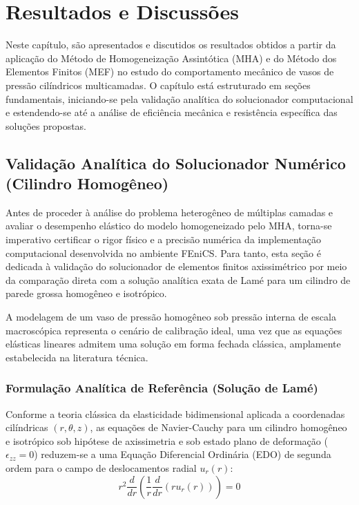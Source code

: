 \chapter{Resultados e Discussões}\label{cap:resultados}

Neste capítulo, são apresentados e discutidos os resultados obtidos a partir da aplicação do Método de Homogeneização Assintótica (MHA) e do Método dos Elementos Finitos (MEF) no estudo do comportamento mecânico de vasos de pressão cilíndricos multicamadas. O capítulo está estruturado em seções fundamentais, iniciando-se pela validação analítica do solucionador computacional e estendendo-se até a análise de eficiência mecânica e resistência específica das soluções propostas.

\section{Validação Analítica do Solucionador Numérico (Cilindro Homogêneo)}\label{sec:validacao_homogeneo}

Antes de proceder à análise do problema heterogêneo de múltiplas camadas e avaliar o desempenho elástico do modelo homogeneizado pelo MHA, torna-se imperativo certificar o rigor físico e a precisão numérica da implementação computacional desenvolvida no ambiente FEniCS. Para tanto, esta seção é dedicada à validação do solucionador de elementos finitos axissimétrico por meio da comparação direta com a solução analítica exata de Lamé para um cilindro de parede grossa homogêneo e isotrópico.

A modelagem de um vaso de pressão homogêneo sob pressão interna de escala macroscópica representa o cenário de calibração ideal, uma vez que as equações elásticas lineares admitem uma solução em forma fechada clássica, amplamente estabelecida na literatura técnica.

\subsection{Formulação Analítica de Referência (Solução de Lamé)}

Conforme a teoria clássica da elasticidade bidimensional aplicada a coordenadas cilíndricas $(r, \theta, z)$, as equações de Navier-Cauchy para um cilindro homogêneo e isotrópico sob hipótese de axissimetria e sob estado plano de deformação ($\epsilon_{zz} = 0$) reduzem-se a uma Equação Diferencial Ordinária (EDO) de segunda ordem para o campo de deslocamentos radial $u_r (r)$:
\begin{equation}
  r^2 \frac{d}{d r} \left(\frac{1}{r} \frac{d}{d r} (r u_r (r))\right) = 0
  \label{eq:edo_lame_v3}
\end{equation}

